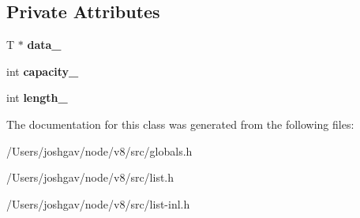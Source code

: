 \subsection*{Private Attributes}
\begin{DoxyCompactItemize}
\item 
T $\ast$ {\bfseries data\+\_\+}\hypertarget{classv8_1_1internal_1_1_list_ae04be1e67feedc2011be4b85cc8baab6}{}\label{classv8_1_1internal_1_1_list_ae04be1e67feedc2011be4b85cc8baab6}

\item 
int {\bfseries capacity\+\_\+}\hypertarget{classv8_1_1internal_1_1_list_ae7c8d1991b1b61525b07e08dcd141fe6}{}\label{classv8_1_1internal_1_1_list_ae7c8d1991b1b61525b07e08dcd141fe6}

\item 
int {\bfseries length\+\_\+}\hypertarget{classv8_1_1internal_1_1_list_a1543b26382a064653bb75237b22148ba}{}\label{classv8_1_1internal_1_1_list_a1543b26382a064653bb75237b22148ba}

\end{DoxyCompactItemize}


The documentation for this class was generated from the following files\+:\begin{DoxyCompactItemize}
\item 
/\+Users/joshgav/node/v8/src/globals.\+h\item 
/\+Users/joshgav/node/v8/src/list.\+h\item 
/\+Users/joshgav/node/v8/src/list-\/inl.\+h\end{DoxyCompactItemize}
